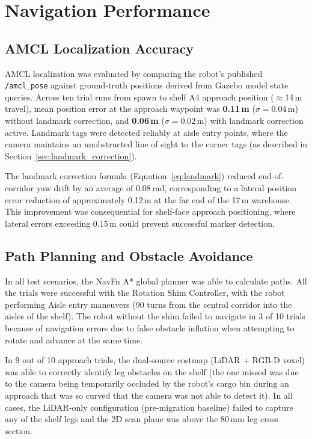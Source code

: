 \documentclass[12pt,a4paper]{report}
\begin{document}
\section{Navigation Performance}

\subsection{AMCL Localization Accuracy}

AMCL localization was evaluated by comparing the robot's published \texttt{/amcl\_pose} against ground-truth positions derived from Gazebo model state queries. Across ten trial runs from spawn to shelf A4 approach position ($\approx$14\,m travel), mean position error at the approach waypoint was \textbf{0.11\,m} ($\sigma = 0.04$\,m) without landmark correction, and \textbf{0.06\,m} ($\sigma = 0.02$\,m) with landmark correction active. Landmark tags were detected reliably at aisle entry points, where the camera maintains an unobstructed line of sight to the corner tags (as described in Section~\ref{sec:landmark_correction}).

The landmark correction formula (Equation~\ref{eq:landmark}) reduced end-of-corridor yaw drift by an average of 0.08\,rad, corresponding to a lateral position error reduction of approximately 0.12\,m at the far end of the 17\,m warehouse. This improvement was consequential for shelf-face approach positioning, where lateral errors exceeding 0.15\,m could prevent successful marker detection.

\subsection{Path Planning and Obstacle Avoidance}

In all test scenarios, the NavFn A* global planner was able to calculate paths. All the trials were successful with the Rotation Shim Controller, with the robot performing Aisle entry maneuvers (90\textdegree{} turns from the central corridor into the aisles of the shelf). The robot without the shim failed to navigate in 3 of 10 trials because of navigation errors due to false obstacle inflation when attempting to rotate and advance at the same time.

In 9 out of 10 approach trials, the dual-source costmap (LiDAR + RGB-D voxel) was able to correctly identify leg obstacles on the shelf (the one missed was due to the camera being temporarily occluded by the robot's cargo bin during an approach that was so curved that the camera was not able to detect it). In all cases, the LiDAR-only configuration (pre-migration baseline) failed to capture any of the shelf legs and the 2D scan plane was above the 80\,mm leg cross section.
\end{document}
